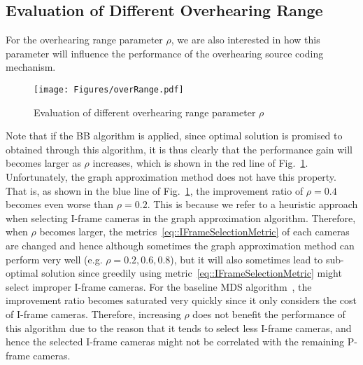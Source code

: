 \subsection{Evaluation of Different Overhearing Range}
For the overhearing range parameter $\rho$, we are also interested in how this parameter will influence the performance of the overhearing source coding mechanism.
%
\begin{figure}
\begin{center}
\texttt{[image: Figures/overRange.pdf]}
\caption{\label{fig::evaOverRange}Evaluation of different overhearing range parameter $\rho$}
\end{center}
\end{figure}
%
Note that if the BB algorithm is applied, since optimal solution is promised to obtained through this algorithm, it is thus clearly that the performance gain will becomes larger as $\rho$ increases, which is shown in the red line of Fig.~\ref{fig::evaOverRange}.
Unfortunately, the graph approximation method does not have this property.
That is, as shown in the blue line of Fig.~\ref{fig::evaOverRange}, the improvement ratio of $\rho = 0.4$ becomes even worse than $\rho = 0.2$.
This is because we refer to a heuristic approach when selecting I-frame cameras in the graph approximation algorithm.
Therefore, when $\rho$ becomes larger, the metrics~\eqref{eq::IFrameSelectionMetric} of each cameras are changed and hence although sometimes the graph approximation method can perform very well (e.g. $\rho = 0.2,0.6,0.8$), but it will also sometimes lead to sub-optimal solution since greedily using metric~\eqref{eq::IFrameSelectionMetric} might select improper I-frame cameras.
For the baseline MDS algorithm~\cite{MWDS_baseline}, the improvement ratio becomes saturated very quickly since it only considers the cost of I-frame cameras.
Therefore, increasing $\rho$ does not benefit the performance of this algorithm due to the reason that it tends to select less I-frame cameras, and hence the selected I-frame cameras might not be correlated with the remaining P-frame cameras.

